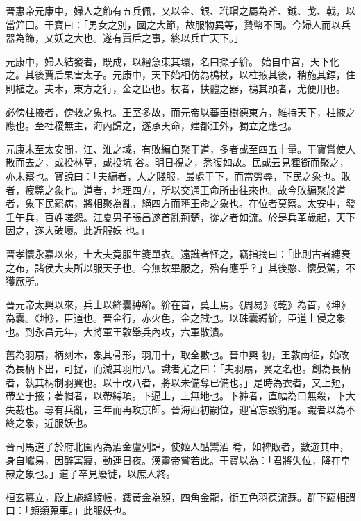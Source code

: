 \begin{pinyinscope}
 晉惠帝元康中，婦人之飾有五兵佩，又以金、銀、玳瑁之屬為斧、鉞、戈、戟，以當笄囗。干寶曰：「男女之別，國之大節，故服物異等，贄幣不同。今婦人而以兵器為飾，又妖之大也。遂有賈后之事，終以兵亡天下。」



 元康中，婦人結發者，既成，以繒急束其環，名曰擷子紒。
 始自中宮，天下化之。其後賈后果害太子。元康中，天下始相仿為樢杖，以柱掖其後，稍施其錞，住則植之。夫木，東方之行，金之臣也。杖者，扶體之器，樢其頭者，尤便用也。



 必傍柱掖者，傍救之象也。王室多故，而元帝以蕃臣樹德東方，維持天下，柱掖之應也。至社稷無主，海內歸之，遂承天命，建都江外，獨立之應也。



 元康末至太安間，江、淮之域，有敗編自聚于道，多者或至四五十量。干寶嘗使人散而去之，或投林草，或投坑
 谷。明日視之，悉復如故。民或云見狸銜而聚之，亦未察也。寶說曰：「夫編者，人之賤服，最處于下，而當勞辱，下民之象也。敗者，疲斃之象也。道者，地理四方，所以交通王命所由往來也。故今敗編聚於道者，象下民罷病，將相聚為亂，絕四方而壅王命之象也。在位者莫察。太安中，發壬午兵，百姓嗟怨。江夏男子張昌遂首亂荊楚，從之者如流。於是兵革歲起，天下因之，遂大破壞。此近服妖
 也。」



 晉孝懷永嘉以來，士大夫竟服生箋單衣。遠識者怪之，竊指摘曰：「此則古者繐衰之布，諸侯大夫所以服天子也。今無故畢服之，殆有應乎？」其後愍、懷晏駕，不獲厥所。



 晉元帝太興以來，兵士以絳囊縛紒。紒在首，莫上焉。《周易》《乾》為首，《坤》為囊。《坤》，臣道也。晉金行，赤火色，金之賊也。以硃囊縛紒，臣道上侵之象也。到永昌元年，大將軍王敦舉兵內攻，六軍散潰。



 舊為羽扇，柄刻木，象其骨形，羽用十，取全數也。晉中興
 初，王敦南征，始改為長柄下出，可捉，而減其羽用八。識者尤之曰：「夫羽扇，翼之名也。創為長柄者，執其柄制羽翼也。以十改八者，將以未備奪已備也。」是時為衣者，又上短，帶至于掖；著帽者，以帶縛項。下逼上，上無地也。下褲者，直幅為口無殺，下大失裁也。尋有兵亂，三年而再攻京師。晉海西初嗣位，迎官忘設豹尾。識者以為不終之象，近服妖也。



 晉司馬道子於府北園內為酒金盧列肆，使姬人酤鬻酒
 肴，如裨販者，數遊其中，身自巘易，因醉寓寢，動連日夜。漢靈帝嘗若此。干寶以為：「君將失位，降在皁隸之象也。」道子卒見廢徙，以庶人終。



 桓玄篡立，殿上施絳綾帳，鏤黃金為顏，四角金龍，銜五色羽葆流蘇。群下竊相謂曰：「頗類蒐車。」此服妖也。




\end{pinyinscope}
